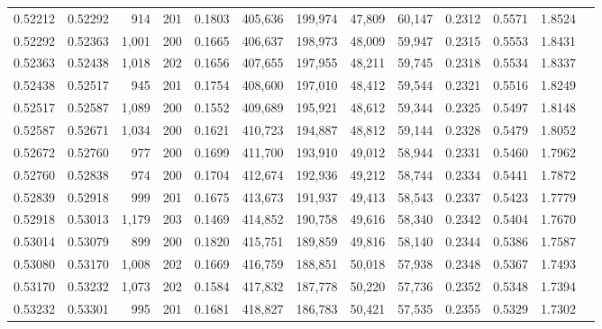\begin{tabular}{rrrrrrrrrrrrr}
0.52212 & 0.52292 &   914 & 201 &                                     0.1803 & 405,636 & 199,974 &  47,809 &  60,147 & 0.2312 & 0.5571 & 1.8524 \\
0.52292 & 0.52363 & 1,001 & 200 &                                     0.1665 & 406,637 & 198,973 &  48,009 &  59,947 & 0.2315 & 0.5553 & 1.8431 \\
0.52363 & 0.52438 & 1,018 & 202 &                                     0.1656 & 407,655 & 197,955 &  48,211 &  59,745 & 0.2318 & 0.5534 & 1.8337 \\
0.52438 & 0.52517 &   945 & 201 &                                     0.1754 & 408,600 & 197,010 &  48,412 &  59,544 & 0.2321 & 0.5516 & 1.8249 \\
0.52517 & 0.52587 & 1,089 & 200 &                                     0.1552 & 409,689 & 195,921 &  48,612 &  59,344 & 0.2325 & 0.5497 & 1.8148 \\
0.52587 & 0.52671 & 1,034 & 200 &                                     0.1621 & 410,723 & 194,887 &  48,812 &  59,144 & 0.2328 & 0.5479 & 1.8052 \\
0.52672 & 0.52760 &   977 & 200 &                                     0.1699 & 411,700 & 193,910 &  49,012 &  58,944 & 0.2331 & 0.5460 & 1.7962 \\
0.52760 & 0.52838 &   974 & 200 &                                     0.1704 & 412,674 & 192,936 &  49,212 &  58,744 & 0.2334 & 0.5441 & 1.7872 \\
0.52839 & 0.52918 &   999 & 201 &                                     0.1675 & 413,673 & 191,937 &  49,413 &  58,543 & 0.2337 & 0.5423 & 1.7779 \\
0.52918 & 0.53013 & 1,179 & 203 &                                     0.1469 & 414,852 & 190,758 &  49,616 &  58,340 & 0.2342 & 0.5404 & 1.7670 \\
0.53014 & 0.53079 &   899 & 200 &                                     0.1820 & 415,751 & 189,859 &  49,816 &  58,140 & 0.2344 & 0.5386 & 1.7587 \\
0.53080 & 0.53170 & 1,008 & 202 &                                     0.1669 & 416,759 & 188,851 &  50,018 &  57,938 & 0.2348 & 0.5367 & 1.7493 \\
0.53170 & 0.53232 & 1,073 & 202 &                                     0.1584 & 417,832 & 187,778 &  50,220 &  57,736 & 0.2352 & 0.5348 & 1.7394 \\
0.53232 & 0.53301 &   995 & 201 &                                     0.1681 & 418,827 & 186,783 &  50,421 &  57,535 & 0.2355 & 0.5329 & 1.7302 \\

\end{tabular}
